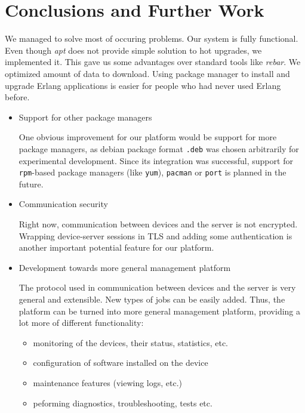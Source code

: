 \section{Conclusions and Further Work}

We managed to solve most of occuring problems. Our system is fully functional. Even though \emph{apt} does not provide simple solution to hot upgrades, we implemented it. This gave us some advantages over standard tools like \emph{rebar}. We optimized amount of data to download. Using package manager to install and upgrade Erlang applications is easier for people who had never used Erlang before.

\begin{itemize}
\item Support for other package managers

One obvious improvement for our platform would be support for more package managers, as
debian package format {\tt .deb} was chosen arbitrarily for experimental development.
Since its integration was successful, support for {\tt rpm}-based package managers (like {\tt yum}),
{\tt pacman} or {\tt port} is planned in the future.

\item Communication security

Right now, communication between devices and the server is not encrypted. Wrapping device-server
sessions in TLS and adding some authentication is another important potential feature for our
platform.

\item Development towards more general management platform

The protocol used in communication between devices and the server is very general
and extensible. New types of jobs can be easily added. Thus, the platform can be turned into
more general management platform, providing a lot more of different functionality:

\begin{itemize}
\item monitoring of the devices, their status, statistics, etc.
\item configuration of software installed on the device
\item maintenance features (viewing logs, etc.)
\item peforming diagnostics, troubleshooting, tests etc.
\end{itemize}

\end{itemize}

